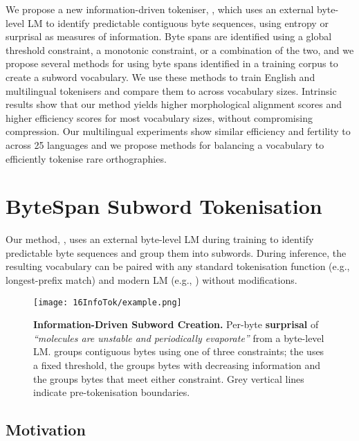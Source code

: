 We propose a new information-driven tokeniser, \tokname, which uses an external byte-level LM to identify predictable contiguous byte sequences, using entropy or surprisal as measures of information. Byte spans are identified using a global threshold constraint, a monotonic constraint, or a combination of the two, and we propose several methods for using byte spans identified in a training corpus to create a subword vocabulary. We use these methods to train English and multilingual tokenisers and compare them to \bpe across vocabulary sizes. Intrinsic results show that our method yields higher morphological alignment scores and higher \renyi efficiency scores for most vocabulary sizes, without compromising compression. Our multilingual experiments show similar \renyi efficiency and fertility to \bpe across 25 languages and we propose methods for balancing a vocabulary to efficiently tokenise rare orthographies. 

\section{ByteSpan Subword Tokenisation}\label{sec:16-bytespan}

Our method, \tokname, uses an external byte-level LM during training to identify predictable byte sequences and group them into subwords. During inference, the resulting vocabulary can be paired with any standard tokenisation function (e.g., longest-prefix match) and modern LM (e.g., \citealp{touvron-2023-llama}) without modifications. 

\begin{figure}[!t]
    \centering
    \texttt{[image: 16InfoTok/example.png]}
    \caption{\textbf{Information-Driven Subword Creation.}
    Per-byte \textbf{surprisal} of \textit{\enquote{molecules are unstable and periodically evaporate}} from a byte-level LM. \tokname groups contiguous bytes using one of three constraints; the  uses a fixed threshold, the  groups bytes with decreasing information and the  groups bytes that meet either constraint. Grey vertical lines indicate pre-tokenisation boundaries.
    }
    \label{fig:16-example}
\end{figure}


\subsection{Motivation}\label{sec:16-motivation}



